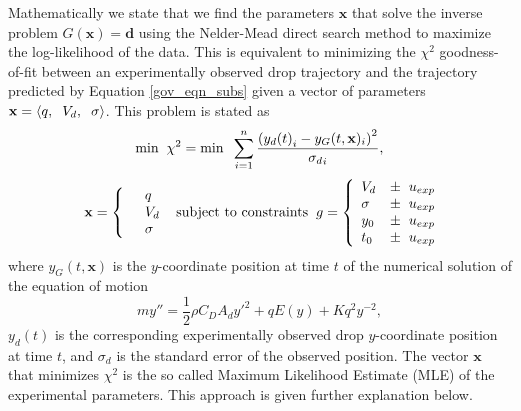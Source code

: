 \documentclass[12pt,a4paper,oneside]{book}
\begin{document}
Mathematically we state that we find the parameters $\mathbf{x}$ that solve the inverse problem $G(\mathbf{x}) = \mathbf{d}$ using the Nelder-Mead direct search method to maximize the log-likelihood of the data. This is equivalent to minimizing the $\chi^2$ goodness-of-fit between an experimentally observed drop trajectory and the trajectory predicted by Equation \ref{gov_eqn_subs} given a vector of parameters $\mathbf{x} = \left\langle q, \hspace{2 mm} V_d, \hspace{2 mm} \sigma \right\rangle$. This problem is stated as  
\[
\mbox{min} \hspace{2 mm} \chi^2 = \mbox{min} \hspace{2 mm} \sum^n_{i=1} \frac{\left({y_d(t)}_i - y_G(t, \mathbf{x})_i \right)^2}{{\sigma_d}_i},
\]
\begin{eqnarray*} \mbox{} \hspace{2 mm} \begin{split} \mathbf{x} = \left\{ \begin{array}{ll}      & q\\
		  &	V_d\\
          & \sigma 
          \end{array} \right. 
          \end{split} \hspace{2 mm} \mbox{subject to constraints} \hspace{2 mm} \begin{split}
          g = \left\{ \begin{array}{ll}
           V_d &\pm \hspace{2 mm} u_{exp}\\
      	   \sigma &\pm  \hspace{2 mm} u_{exp}\\
      	   y_0 &\pm \hspace{2 mm} u_{exp}\\
      	   t_0 &\pm \hspace{2 mm} u_{exp}\\
          \end{array} \right. 
          \end{split}
\end{eqnarray*}
where $y_G(t, \mathbf{x})$ is the $y$-coordinate position at time $t$ of the numerical solution of the equation of motion
\[
m y'' = \frac{1}{2} \rho C_D A_d {y'}^2 + q E(y) + K q^2 y^{-2}, \]
$y_d(t)$ is the corresponding experimentally observed drop $y$-coordinate position at time $t$, and $\sigma_d$ is the standard error of the observed position. The vector $\mathbf{x}$ that minimizes $\chi^2$ is the so called Maximum Likelihood Estimate (MLE) of the experimental parameters. This approach is given further explanation below.
\end{document}
